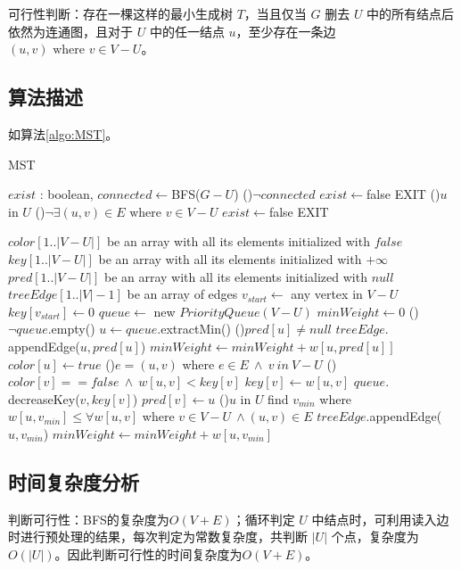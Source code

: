 \documentclass[11pt]{article}
\begin{document}
    可行性判断：存在一棵这样的最小生成树 $T$，当且仅当 $G$ 删去 $U$ 中的所有结点后依然为连通图，且对于 $U$ 中的任一结点 $u$，至少存在一条边$(u, v)\text{ where } v\in V-U$。

\subsection*{算法描述}
如算法\ref{algo:MST}。
\begin{algorithm}
    \caption{MST}\label{algo:MST}
    \Var $exist$ : boolean, $connected \leftarrow $BFS($G-U$)\;
    \If(){$\lnot connected$}{
        $exist \leftarrow $false\;
        EXIT\;
    } 
    \ForAll(){$u$ in $U$}{
        \If(){$\lnot \exists (u, v)\in E \text{ where } v\in V-U$}{
            $exist \leftarrow $false\;
            EXIT\;
        }
    }

      \;  
    \Var $color[1..|V-U|]$ be an array with all its elements initialized with $false$\;
    \Var $key[1..|V-U|]$ be an array with all its elements initialized with $+\infty$\;
    \Var $pred[1..|V-U|]$ be an array with all its elements initialized with $null$\;
    \Var $treeEdge[1..|V|-1]$ be an array of edges\;
    \Var $v_{start} \leftarrow$ any vertex in $V - U$\;
    $key[v_{start}] \leftarrow 0$\;
    \Var $queue \leftarrow$ new $PriorityQueue(V-U)$\;
    \Var $minWeight \leftarrow 0$\;
    \While(){$\lnot queue$.empty()}{
        $u \leftarrow queue.$extractMin()\;
        \If(){$pred[u] \neq null$}{
            $treeEdge.$appendEdge($u, pred[u]$)\;
            $minWeight \leftarrow minWeight + w[u, pred[u]]$\;
        }
        $color[u] \leftarrow true$\;
        \ForAll(){$e=(u, v)$ where $e\in E\ \land \ v \ in\ V-U$ }{
            \If(){$color[v] == false\ \land\ w[u, v]<key[v]$}{
                $key[v] \leftarrow w[u, v]$\;
                $queue.$decreaseKey($v, key[v]$)\;
                $pred[v] \leftarrow u$\;
            }
        }
    } 
    \ForAll(){$u$ in $U$}{
        find $v_{min}$ where $w[u, v_{min}] \leq \forall w[u, v]$ where $v \in V-U\ \land (u, v)\in E$\;
        $treeEdge.$appendEdge($u, v_{min}$)\;
        $minWeight \leftarrow minWeight + w[u, v_{min}]$\;
    }
\end{algorithm}

\subsection*{时间复杂度分析}
    判断可行性：BFS的复杂度为$O(V+E)$；循环判定 $U$ 中结点时，可利用读入边时进行预处理的结果，每次判定为常数复杂度，共判断 $|U|$ 个点，复杂度为$O(|U|)$。因此判断可行性的时间复杂度为$O(V+E)$。
\end{document}
